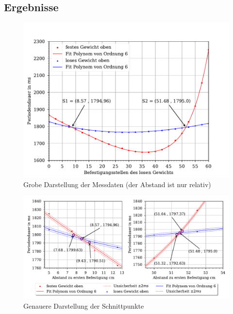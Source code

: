 \documentclass[11pt, a4paper]{article}
\begin{document}
    \subsection{Ergebnisse}

    \begin{figure}[ht]
        \centering
        \includegraphics[width=120mm]{./Reversion_grob.pdf}

        \caption{Grobe Darstellung der Messdaten (der Abstand ist nur relativ)}
        \label{fig:revgrob}
    \end{figure}
    \begin{figure}[htb]
        \centering
        \includegraphics[width=\textwidth]{./Reversion_fein.pdf}

        \caption{Genauere Darstellung der Schnittpunkte}
        \label{fig:revfein1}
    \end{figure}
\end{document}
